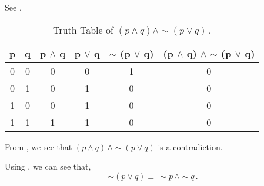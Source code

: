 %
%

\begin{subquestions}


\subquestion

See .
\begin{table}[ht]
	\centering
	\begin{tabular}{|c|c|c|c|c|c|}
		\hline
		p & q & p $\land$ q & p $\lor$ q & $\sim$ (p $\lor$ q) & (p $\land$ q) $\land$ $\sim$ (p $\lor$ q) \\
		\hline
		0 & 0 & 0 & 0 & 1 & 0 \\
		0 & 1 & 0 & 1 & 0 & 0 \\
		1 & 0 & 0 & 1 & 0 & 0 \\
		1 & 1 & 1 & 1 & 0 & 0 \\
		\hline
	\end{tabular}
	\caption{\label{2013:q1:tab:TruthTab1} Truth Table of $(p \land q) \land \sim (p \lor q)$\,.}
\end{table}


\subquestion

From , we see that $(p \land q)\, \land \sim (p \lor q)$ is a contradiction.


\subquestion

Using , we can see that,
\begin{equation}
	\sim (p \lor q) \equiv \, \sim p \, \land \sim q \,.
\end{equation}


\end{subquestions}

